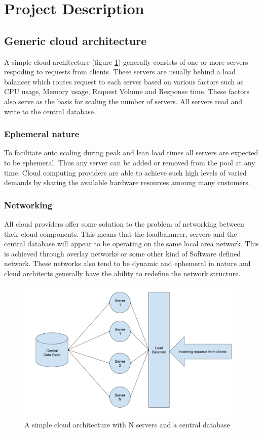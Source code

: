 \documentclass[10pt,conference]{IEEEtran}
\begin{document}
\section{Project Description}


\subsection{Generic cloud architecture}

A simple cloud architecture (figure \ref{fig:generic_cloud_architecture}) generally consists of one 
or more servers respoding to requests from clients\cite{moreno-vozmediano_iaas_2012}. These servers 
are usually behind a load balancer which routes request to each server based on various factors such 
as CPU usage, Memory usage, Request Volume and Response time. These factors also serve as the basis 
for scaling the number of servers. All servers read and write to the central database. 

\subsubsection{Ephemeral nature} To facilitate auto scaling during peak and lean load times all 
servers are expected to be ephemeral. Thus any server can be added or removed from the pool at any 
time. Cloud computing providers are able to achieve such high levels of varied demands by sharing 
the available hardware resources amoung many customers.

\subsubsection{Networking} All cloud providers offer some solution to the problem of networking 
between 
their cloud components. This means that the loadbalancer, servers and the central database will 
appear to be operating on the same local area network. This is achieved through overlay networks or 
some other kind of Software defined network. These networks also tend to be dynamic and ephemeral in 
nature and cloud architects generally have the ability to redefine the network structure.


\begin{figure}
\centering
\includegraphics[width=0.7\linewidth]{./generic_cloud_architecture}
\caption[A simple cloud architecture with N servers and a central database]{A simple cloud 
architecture with N servers and a central database}
\label{fig:generic_cloud_architecture}
\end{figure}
\end{document}
